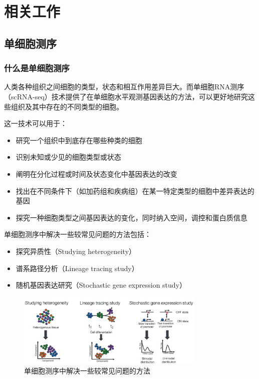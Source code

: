 
\chapter{相关工作}

\section{单细胞测序}

\subsection{什么是单细胞测序}
  人类各种组织之间细胞的类型，状态和相互作用差异巨大。而单细胞RNA测序（scRNA-seq）技术提供了在单细胞水平观测基因表达的方法，可以更好地研究这些组织及其中存在的不同类型的细胞。

  这一技术可以用于：
\begin{itemize}
    \item 研究一个组织中到底存在哪些种类的细胞
    \item 识别未知或少见的细胞类型或状态
    \item 阐明在分化过程或时间及状态变化中基因表达的改变
    \item 找出在不同条件下（如加药组和疾病组）在某一特定类型的细胞中差异表达的基因
    \item 探究一种细胞类型之间基因表达的变化，同时纳入空间，调控和蛋白质信息
\end{itemize}

  单细胞测序中解决一些较常见问题的方法\cite{liu2016single,junker2014every}包括：
\begin{itemize}
    \item 探究异质性（Studying heterogeneity）
    \item 谱系路径分析（Lineage tracing study）
    \item 随机基因表达研究（Stochastic gene expression study）
\end{itemize}

\begin{figure}[!htb]
  \centering
  \includegraphics[width=0.8\textwidth]{figs/scseq-purpose.png}
  \caption{单细胞测序中解决一些较常见问题的方法}
  \label{fig:scseq-purpose}
\end{figure}

